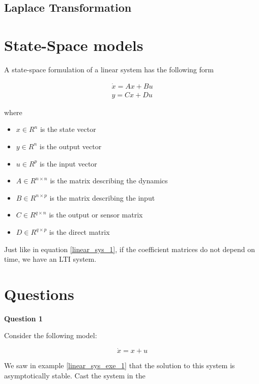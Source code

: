 \subsection{Laplace Transformation}


\section{State-Space models}

A state-space formulation of a linear system has the following form



\begin{eqnarray}
\dot{x} = Ax + Bu \\
y = Cx + Du
\label{linear_space_form}
\end{eqnarray}

where

\begin{itemize}
\item $x \in R^{n}$ is the state vector
\item $y \in R^{n}$ is the output vector
\item $u \in R^{p}$ is the input vector 
\item $A \in R^{n \times n}$ is the matrix describing the dynamics 
\item $B \in R^{n \times p}$ is the matrix describing the input 
\item $C \in R^{q \times n}$ is the output or sensor matrix 
\item $D \in R^{q \times p}$ is the direct matrix 
\end{itemize}

Just like in equation \ref{linear_sys_1}, if the coefficient matrices do not depend on time, we have an LTI system.



\section{Questions}


\textbf{Question 1}

Consider the following model:

\begin{equation}
\dot{x} = x +u \nonumber
\end{equation}

We saw in example \ref{linear_sys_exe_1} that the solution to this system is asymptotically stable. Cast the system in the

